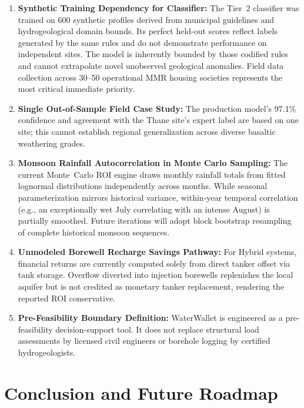 ﻿\documentclass[conference]{IEEEtran}
\begin{document}
\begin{enumerate}
  \item \textbf{Synthetic Training Dependency for Classifier:} The Tier~2 classifier was trained on 600 synthetic profiles derived from municipal guidelines and hydrogeological domain bounds. Its perfect held-out scores reflect labels generated by the same rules and do not demonstrate performance on independent sites. The model is inherently bounded by those codified rules and cannot extrapolate novel unobserved geological anomalies. Field data collection across 30--50 operational MMR housing societies represents the most critical immediate priority.
  
  \item \textbf{Single Out-of-Sample Field Case Study:} The production model's 97.1\% confidence and agreement with the Thane site's expert label are based on one site; this cannot establish regional generalization across diverse basaltic weathering grades.
  
  \item \textbf{Monsoon Rainfall Autocorrelation in Monte Carlo Sampling:} The current Monte~Carlo ROI engine draws monthly rainfall totals from fitted lognormal distributions independently across months. While seasonal parameterization mirrors historical variance, within-year temporal correlation (e.g., an exceptionally wet July correlating with an intense August) is partially smoothed. Future iterations will adopt block bootstrap resampling of complete historical monsoon sequences.
  
  \item \textbf{Unmodeled Borewell Recharge Savings Pathway:} For Hybrid systems, financial returns are currently computed solely from direct tanker offset via tank storage. Overflow diverted into injection borewells replenishes the local aquifer but is not credited as monetary tanker replacement, rendering the reported ROI conservative.
  
  \item \textbf{Pre-Feasibility Boundary Definition:} WaterWallet is engineered as a pre-feasibility decision-support tool. It does not replace structural load assessments by licensed civil engineers or borehole logging by certified hydrogeologists.
\end{enumerate}

\section{Conclusion and Future Roadmap}
\label{sec:conclusion}
\end{document}
